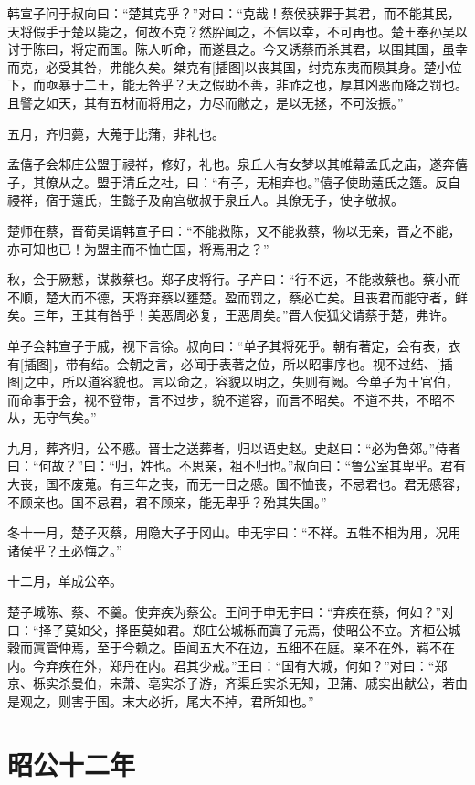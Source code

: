 \documentclass[a4paper,12pt,UTF8,twoside]{ctexbook}
\begin{document}
韩宣子问于叔向曰：“楚其克乎？”对曰：“克哉！蔡侯获罪于其君，而不能其民，天将假手于楚以毙之，何故不克？然肸闻之，不信以幸，不可再也。楚王奉孙吴以讨于陈曰，将定而国。陈人听命，而遂县之。今又诱蔡而杀其君，以围其国，虽幸而克，必受其咎，弗能久矣。桀克有[插图]以丧其国，纣克东夷而陨其身。楚小位下，而亟暴于二王，能无咎乎？天之假助不善，非祚之也，厚其凶恶而降之罚也。且譬之如天，其有五材而将用之，力尽而敝之，是以无拯，不可没振。”

五月，齐归薨，大蒐于比蒲，非礼也。

孟僖子会邾庄公盟于祲祥，修好，礼也。泉丘人有女梦以其帷幕孟氏之庙，遂奔僖子，其僚从之。盟于清丘之社，曰：“有子，无相弃也。”僖子使助薳氏之簉。反自祲祥，宿于薳氏，生懿子及南宫敬叔于泉丘人。其僚无子，使字敬叔。

楚师在蔡，晋荀吴谓韩宣子曰：“不能救陈，又不能救蔡，物以无亲，晋之不能，亦可知也已！为盟主而不恤亡国，将焉用之？”

秋，会于厥慭，谋救蔡也。郑子皮将行。子产曰：“行不远，不能救蔡也。蔡小而不顺，楚大而不德，天将弃蔡以壅楚。盈而罚之，蔡必亡矣。且丧君而能守者，鲜矣。三年，王其有咎乎！美恶周必复，王恶周矣。”晋人使狐父请蔡于楚，弗许。

单子会韩宣子于戚，视下言徐。叔向曰：“单子其将死乎。朝有著定，会有表，衣有[插图]，带有结。会朝之言，必闻于表著之位，所以昭事序也。视不过结、[插图]之中，所以道容貌也。言以命之，容貌以明之，失则有阙。今单子为王官伯，而命事于会，视不登带，言不过步，貌不道容，而言不昭矣。不道不共，不昭不从，无守气矣。”

九月，葬齐归，公不慼。晋士之送葬者，归以语史赵。史赵曰：“必为鲁郊。”侍者曰：“何故？”曰：“归，姓也。不思亲，祖不归也。”叔向曰：“鲁公室其卑乎。君有大丧，国不废蒐。有三年之丧，而无一日之慼。国不恤丧，不忌君也。君无慼容，不顾亲也。国不忌君，君不顾亲，能无卑乎？殆其失国。”

冬十一月，楚子灭蔡，用隐大子于冈山。申无宇曰：“不祥。五牲不相为用，况用诸侯乎？王必悔之。”

十二月，单成公卒。

楚子城陈、蔡、不羹。使弃疾为蔡公。王问于申无宇曰：“弃疾在蔡，何如？”对曰：“择子莫如父，择臣莫如君。郑庄公城栎而寘子元焉，使昭公不立。齐桓公城穀而寘管仲焉，至于今赖之。臣闻五大不在边，五细不在庭。亲不在外，羁不在内。今弃疾在外，郑丹在内。君其少戒。”王曰：“国有大城，何如？”对曰：“郑京、栎实杀曼伯，宋萧、亳实杀子游，齐渠丘实杀无知，卫蒲、戚实出献公，若由是观之，则害于国。末大必折，尾大不掉，君所知也。”


\chapter{昭公十二年}
\end{document}
